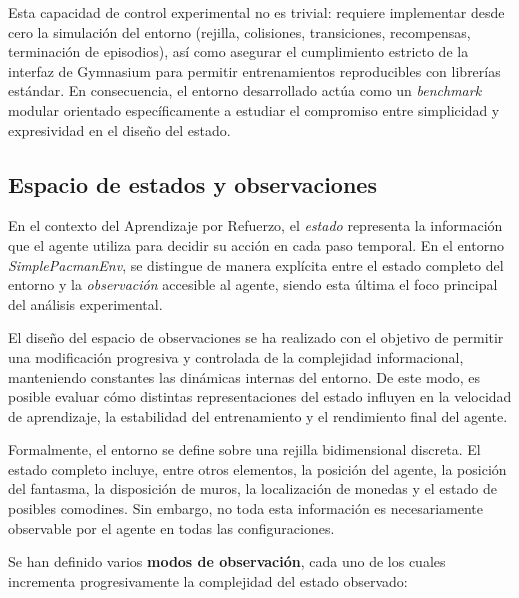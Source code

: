 Esta capacidad de control experimental no es trivial: requiere implementar desde cero la simulación del entorno (rejilla, colisiones, transiciones, recompensas, terminación de episodios), así como asegurar el cumplimiento estricto de la interfaz de Gymnasium para permitir entrenamientos reproducibles con librerías estándar. En consecuencia, el entorno desarrollado actúa como un \textit{benchmark} modular orientado específicamente a estudiar el compromiso entre simplicidad y expresividad en el diseño del estado.

\subsection{Espacio de estados y observaciones}

En el contexto del Aprendizaje por Refuerzo, el \textit{estado} representa la información que el agente utiliza para decidir su acción en cada paso temporal. En el entorno \textit{SimplePacmanEnv}, se distingue de manera explícita entre el estado completo del entorno y la \textit{observación} accesible al agente, siendo esta última el foco principal del análisis experimental.

El diseño del espacio de observaciones se ha realizado con el objetivo de permitir una modificación progresiva y controlada de la complejidad informacional, manteniendo constantes las dinámicas internas del entorno. De este modo, es posible evaluar cómo distintas representaciones del estado influyen en la velocidad de aprendizaje, la estabilidad del entrenamiento y el rendimiento final del agente.

Formalmente, el entorno se define sobre una rejilla bidimensional discreta. El estado completo incluye, entre otros elementos, la posición del agente, la posición del fantasma, la disposición de muros, la localización de monedas y el estado de posibles comodines. Sin embargo, no toda esta información es necesariamente observable por el agente en todas las configuraciones.

Se han definido varios \textbf{modos de observación}, cada uno de los cuales incrementa progresivamente la complejidad del estado observado:

